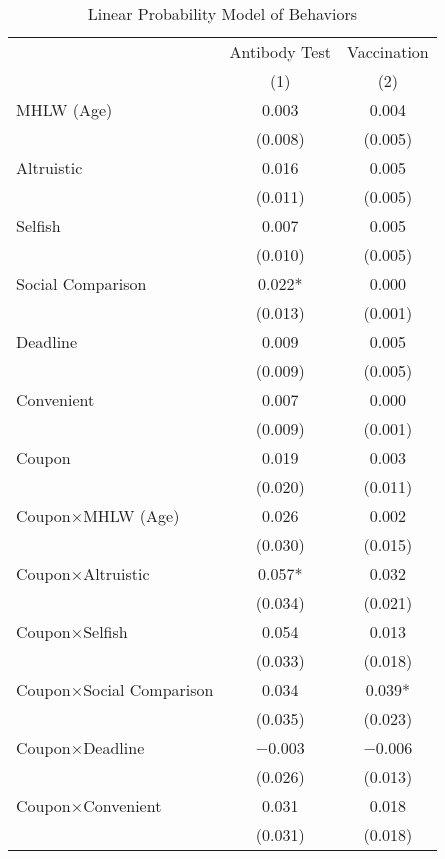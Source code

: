 \begin{table}

\caption{Linear Probability Model of Behaviors \label{tab:act-reg}}
\centering
\fontsize{9}{11}\selectfont
\begin{threeparttable}
\begin{tabular}[t]{lcc}
\toprule
\multicolumn{1}{c}{ } & \multicolumn{1}{c}{Antibody Test} & \multicolumn{1}{c}{Vaccination} \\
\cmidrule(l{3pt}r{3pt}){2-2} \cmidrule(l{3pt}r{3pt}){3-3}
  & (1) & (2)\\
\midrule
MHLW (Age) & \num{0.003} & \num{0.004}\\
 & (\num{0.008}) & (\num{0.005})\\
Altruistic & \num{0.016} & \num{0.005}\\
 & (\num{0.011}) & (\num{0.005})\\
Selfish & \num{0.007} & \num{0.005}\\
 & (\num{0.010}) & (\num{0.005})\\
Social Comparison & \num{0.022}* & \num{0.000}\\
 & (\num{0.013}) & (\num{0.001})\\
Deadline & \num{0.009} & \num{0.005}\\
 & (\num{0.009}) & (\num{0.005})\\
Convenient & \num{0.007} & \num{0.000}\\
 & (\num{0.009}) & (\num{0.001})\\
Coupon & \num{0.019} & \num{0.003}\\
 & (\num{0.020}) & (\num{0.011})\\
Coupon×MHLW (Age) & \num{0.026} & \num{0.002}\\
 & (\num{0.030}) & (\num{0.015})\\
Coupon×Altruistic & \num{0.057}* & \num{0.032}\\
 & (\num{0.034}) & (\num{0.021})\\
Coupon×Selfish & \num{0.054} & \num{0.013}\\
 & (\num{0.033}) & (\num{0.018})\\
Coupon×Social Comparison & \num{0.034} & \num{0.039}*\\
 & (\num{0.035}) & (\num{0.023})\\
Coupon×Deadline & \num{-0.003} & \num{-0.006}\\
 & (\num{0.026}) & (\num{0.013})\\
Coupon×Convenient & \num{0.031} & \num{0.018}\\
 & (\num{0.031}) & (\num{0.018})\\

\end{tabular}
\end{threeparttable}
\end{table}
